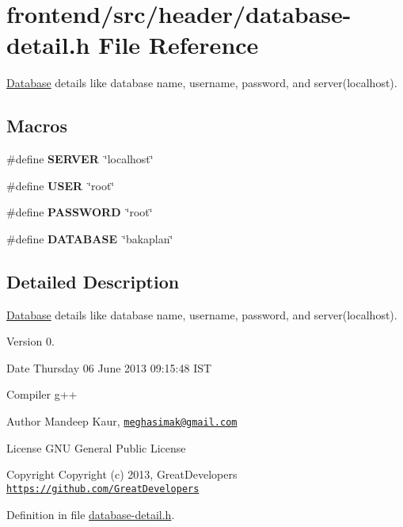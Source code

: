\hypertarget{database-detail_8h}{\section{frontend/src/header/database-\/detail.h File Reference}
\label{database-detail_8h}
}


\hyperlink{classDatabase}{Database} details like database name, username, password, and server(localhost).  


\subsection*{Macros}
\begin{DoxyCompactItemize}
\item 
\hypertarget{database-detail_8h_a24cd3c37a165a8c4626d9e78df4574ff}{\#define {\bfseries S\-E\-R\-V\-E\-R}~\char`\"{}localhost\char`\"{}}\label{database-detail_8h_a24cd3c37a165a8c4626d9e78df4574ff}

\item 
\hypertarget{database-detail_8h_a8bfbbf31b7d3c07215440d18a064b7f4}{\#define {\bfseries U\-S\-E\-R}~\char`\"{}root\char`\"{}}\label{database-detail_8h_a8bfbbf31b7d3c07215440d18a064b7f4}

\item 
\hypertarget{database-detail_8h_a9e8538fad4eee548302ad9f60e6d47ca}{\#define {\bfseries P\-A\-S\-S\-W\-O\-R\-D}~\char`\"{}root\char`\"{}}\label{database-detail_8h_a9e8538fad4eee548302ad9f60e6d47ca}

\item 
\hypertarget{database-detail_8h_a39dc88d73783e112dbfcf98adbdbefa6}{\#define {\bfseries D\-A\-T\-A\-B\-A\-S\-E}~\char`\"{}bakaplan\char`\"{}}\label{database-detail_8h_a39dc88d73783e112dbfcf98adbdbefa6}

\end{DoxyCompactItemize}


\subsection{Detailed Description}
\hyperlink{classDatabase}{Database} details like database name, username, password, and server(localhost). \begin{DoxyVersion}{Version}
0. 
\end{DoxyVersion}
\begin{DoxyDate}{Date}
Thursday 06 June 2013 09\-:15\-:48 I\-S\-T\par
 Compiler g++
\end{DoxyDate}
\begin{DoxyAuthor}{Author}
Mandeep Kaur, \href{mailto:meghasimak@gmail.com}{\tt meghasimak@gmail.\-com}\par
 License G\-N\-U General Public License 
\end{DoxyAuthor}
\begin{DoxyCopyright}{Copyright}
Copyright (c) 2013, Great\-Developers \href{https://github.com/GreatDevelopers}{\tt https\-://github.\-com/\-Great\-Developers} 
\end{DoxyCopyright}


Definition in file \hyperlink{database-detail_8h_source}{database-\/detail.\-h}.

